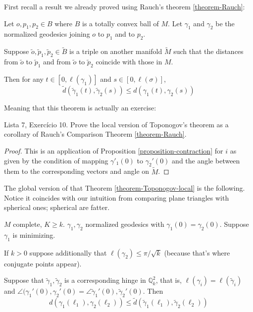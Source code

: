 First recall a result we already proved using Rauch's theorem
\ref{theorem-Rauch}:

\begin{theorem}
\label{theorem-Toponogov-local}
Let $o,p_1,p_2 \in B$ where $B$ is a totally convex ball of $M$. Let $\gamma_1$
and $\gamma_2$ be the normalized geodesics joining $o$ to $p_1$ and to $p_2$.

Suppose $\tilde{o}, \tilde{p}_1,\tilde{p}_2 \in \tilde{B}$ is a triple on 
another manifold $\tilde{M}$ such that the distances from $\tilde{o}$ to
$\tilde{p}_1$ and from $\tilde{o}$ to $\tilde{p}_2$ coincide with those in $M$.

Then for any $t \in [0,\ell(\gamma_1)]$ and $s \in [0,\ell(\sigma)]$,
$$
\tilde{d}(\tilde{\gamma}_1(t),\tilde{\gamma}_2(s))\leq d(\gamma_1(t),\gamma_2(s))
$$
\end{theorem}

Meaning that this theorem is actually an exercise:

\begin{exercise}
\label{exercise-Toponogov-from-Rauch}
Lista 7, Exercício 10. Prove the local version of Toponogov's theorem as a 
corollary of Rauch's Comparison Theorem \ref{theorem-Rauch}.
\end{exercise}

\begin{proof}
This is an application of Proposition \ref{proposition-contraction} for $i$ as
given by the condition of mapping $\gamma'_1(0)$ to $\gamma_2'(0)$ and the angle
between them to the corresponding vectors and angle on $\tilde{M}$.
\end{proof}

The global version of that Theorem \ref{theorem-Toponogov-local} is the
following. Notice it coincides with our intuition from comparing plane triangles
with spherical ones; spherical are fatter.

\begin{theorem}
\label{theorem-Toponogov-hinge}
$M$ complete, $K \geq k$. $\gamma_1,\gamma_2$ normalized geodesics with
$\gamma_1(0)=\gamma_2(0)$. Suppose $\gamma_1$ is minimizing.

If $k>0$ suppose additionally that $\ell(\gamma_2) \leq \pi/\sqrt{k}$ (because
that's where conjugate points appear).

Suppose that $\tilde{\gamma}_1,\tilde{\gamma}_2$ is a corresponding hinge in
$\mathbb{Q}_k^2$, that is, $\ell(\gamma_i)=\ell(\tilde{\gamma}_i)$ and
$\angle(\gamma_1'(0),\gamma_2'(0)=
\angle\tilde{\gamma}_1'(0),\tilde{\gamma}_2'(0)$. Then
\begin{equation}
\label{equation-Toponogov}
d(\gamma_1(\ell_1),\gamma_2(\ell_2)) \leq 
\tilde{d}(\tilde{\gamma}_1(\ell_1),\tilde{\gamma}_2(\ell_2))
\end{equation}
\end{theorem}

